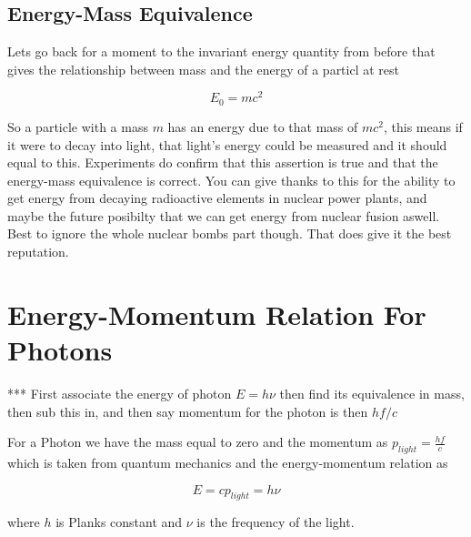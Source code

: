 
\subsection{Energy-Mass Equivalence} \label{subsect: Energy-Mass Equivalence}

Lets go back for a moment to the invariant energy quantity from before that gives the relationship between mass and the energy of a particl at rest

\begin{equation}
	E_0 = mc^2
\end{equation}

So a particle with a mass $m$ has an energy due to that mass of $mc^2$, this means if it were to decay into light, that light's energy could be measured and it should equal to this.
Experiments do confirm that this assertion is true and that the energy-mass equivalence is correct.
You can give thanks to this for the ability to get energy from decaying radioactive elements in nuclear power plants, and maybe the future posibilty that we can get energy from nuclear fusion aswell.
Best to ignore the whole nuclear bombs part though.
That does give it the best reputation.

\section{Energy-Momentum Relation For Photons} \label{sect: Energy-Momentum Relation For Photons}

*** First associate the energy of photon $E = h \nu$ then find its equivalence in mass, then sub this in, and then say momentum for the photon is then $hf/c$

For a Photon we have the mass equal to zero and the momentum as $p_{light} = \frac{hf}{c}$ which is taken from quantum mechanics and the energy-momentum relation as

\begin{equation}
	E ={c}p_{light} = h \nu
\end{equation}

where ${h}$ is Planks constant and ${\nu}$ is the frequency of the light.


